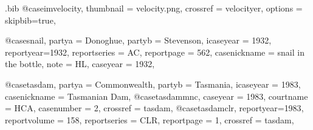 \begin{filecontents*}[overwrite]{\jobname.bib}
@case{imvelocity,
  thumbnail = {velocity.png},
  crossref = {velocityer},
  options = {skipbib=true},      
}



@case{snail,
  partya = {Donoghue}, 
  partyb = {Stevenson},
  icaseyear = {1932},
  reportyear={1932},
  reportseries = {AC},
  reportpage = {562},
  casenickname = {snail in the bottle},
  note = {HL},
  caseyear = {1932},
}


@case{tasdam,
  partya = {Commonwealth}, 
  partyb = {Tasmania},
  icaseyear = {1983},
  casenickname = {Tasmanian Dam},
  }
@case{tasdammnc,
  caseyear = {1983},
  courtname = {HCA},
  casenumber = {2},
  crossref = {tasdam},
  }
@case{tasdamclr,
  reportyear={1983},
  reportvolume = {158},
  reportseries = {CLR},
  reportpage = {1},
  crossref = {tasdam},
  }


\end{filecontents*}
